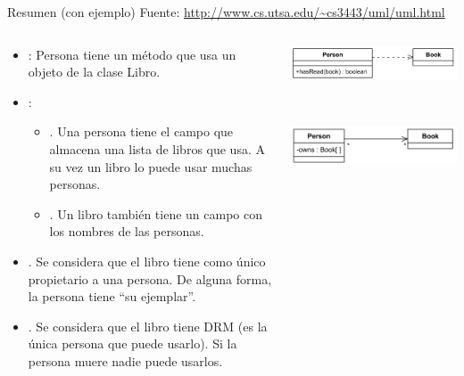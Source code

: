 \documentclass[10pt,envcountsect,spanish]{beamer}
\begin{document}


\begin{frame}{Resumen (con ejemplo)}
{Fuente: \url{http://www.cs.utsa.edu/~cs3443/uml/uml.html} }

\begin{columns}
\begin{column}{.51\textwidth}
\begin{itemize}
\item {}: Persona tiene un método que usa un objeto de la clase Libro.
\item {}: 
\begin{itemize}
\item {}. Una persona tiene el campo  que almacena una lista de libros que usa. A su vez un libro lo puede usar muchas personas.
\item {}. Un libro también tiene un campo con los nombres de las personas.
\end{itemize}

\item {}. Se considera que el libro tiene como único propietario a una persona. De alguna forma, la persona tiene ``su ejemplar''.

\item {}. Se considera que el libro tiene DRM  (es la única persona que puede usarlo). Si la persona muere nadie puede usarlos.
\end{itemize}
\end{column}
\begin{column}{.38\textwidth}
\centerline{\includegraphics[width=\textwidth]{fig/dependency}}

\

\centerline{\includegraphics[width=\textwidth]{fig/unidirectional}}


\end{column}
\end{columns}
\end{frame}
\end{document}
